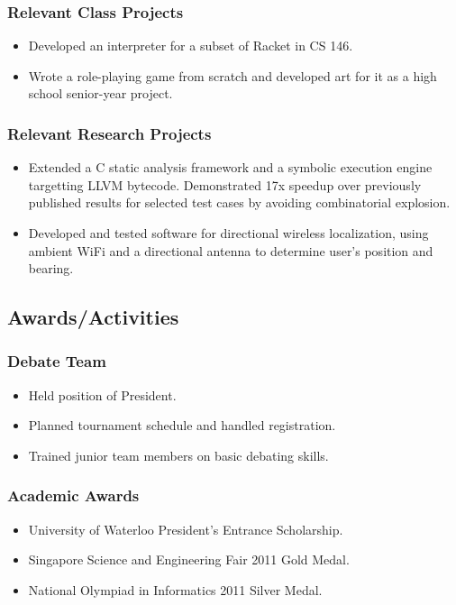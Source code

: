 \documentclass[letterpaper]{article}
\begin{document}
\subsubsection*{Relevant Class Projects}
\begin{itemize}
\setlength\itemsep{0em}
\item Developed an interpreter for a subset of Racket in CS 146.
\item Wrote a role-playing game from scratch and developed art for it as a high school senior-year project.
\end{itemize}

\subsubsection*{Relevant Research Projects}
\begin{itemize}
\setlength\itemsep{0em}
\item Extended a C static analysis framework and a symbolic execution engine targetting LLVM bytecode. Demonstrated 17x speedup over previously published results for selected test cases by avoiding combinatorial explosion.
\item Developed and tested software for directional wireless localization, using ambient WiFi and a directional antenna to determine user's position and bearing.
\end{itemize}

\vspace{1em}

\begin{center}
\section*{Awards/Activities}
\end{center}

\subsubsection*{Debate Team}
\begin{itemize}
\setlength\itemsep{0em}
\item Held position of President.
\item Planned tournament schedule and handled registration.
\item Trained junior team members on basic debating skills.
\end{itemize}

\subsubsection*{Academic Awards}
\begin{itemize}
\setlength\itemsep{0em}
\item University of Waterloo President's Entrance Scholarship.
\item Singapore Science and Engineering Fair 2011 Gold Medal.
\item National Olympiad in Informatics 2011 Silver Medal.
\end{itemize}
\end{document}
